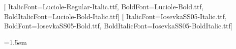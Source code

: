 \setmainfont{Luciole-Regular.ttf}[
  ItalicFont=Luciole-Regular-Italic.ttf,
  BoldFont=Luciole-Bold.ttf,
  BoldItalicFont=Luciole-Bold-Italic.ttf]
\setmonofont{IosevkaSS05-Regular.ttf}[
  ItalicFont=IosevkaSS05-Italic.ttf,
  BoldFont=IosevkaSS05-Bold.ttf,
  BoldItalicFont=IosevkaSS05-BoldItalic.ttf]

\emergencystretch=1.5em

\makeatletter
\renewcommand{\tiny}        {\@setfontsize\tiny{7}{8.5}}
\renewcommand{\scriptsize}  {\@setfontsize\scriptsize{8}{10}}
\renewcommand{\footnotesize}{\@setfontsize\footnotesize{9}{11.5}}
\renewcommand{\small}       {\@setfontsize\small{10}{13}}
\renewcommand{\normalsize}  {\@setfontsize\normalsize{11}{14.3}}
\renewcommand{\large}       {\@setfontsize\large{13}{16}}
\renewcommand{\Large}       {\@setfontsize\Large{15}{18}}
\renewcommand{\LARGE}       {\@setfontsize\LARGE{17}{20}}
\renewcommand{\huge}        {\@setfontsize\huge{20}{23}}
\renewcommand{\Huge}        {\@setfontsize\Huge{23}{26}}

\renewcommand{\section}{\@startsection{section}{1}{\z@}{-3.5ex \@plus -1ex \@minus -.2ex}{2.3ex \@plus.2ex}{\normalfont\Large}}
\renewcommand{\subsection}{\@startsection{subsection}{2}{\z@}{-3.25ex\@plus -1ex \@minus -.2ex}{1.5ex \@plus .2ex}{\normalfont\large}}
\renewcommand{\subsubsection}{\@startsection{subsubsection}{3}{\z@}{-3.25ex\@plus -1ex \@minus -.2ex}{1.5ex \@plus .2ex}{\normalfont\normalsize}}
\makeatother

%
%
\usepackage{array,booktabs,longtable,tabularx,xltabular,multirow,makecell,diagbox,changepage}

